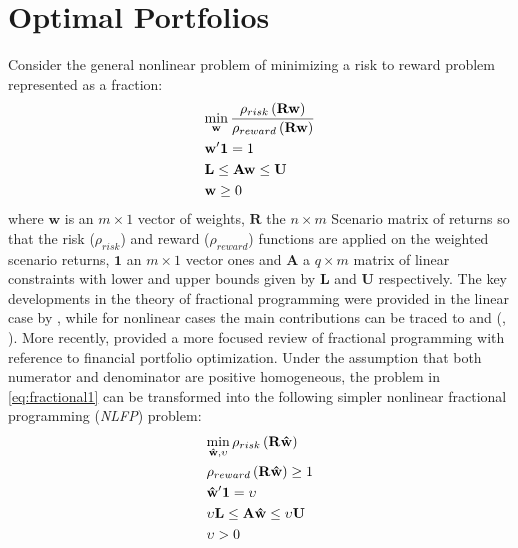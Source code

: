 \section{Optimal Portfolios}\label{sec:4}
Consider the general nonlinear problem of minimizing a risk to reward problem represented as a fraction:
\begin{equation}\label{eq:fractional1}
\begin{gathered}
  \mathop {\min }\limits_{\mathbf{w}} \frac{{{\rho _{risk}}\left( {{\mathbf{Rw}}} \right)}}{{{\rho _{reward}}\left( {{\mathbf{Rw}}} \right)}} \hfill \\
  {\mathbf{w}}'{\mathbf{1}}=1 \hfill \\
  {\mathbf{L}} \leq {\mathbf{Aw}} \leq {\mathbf{U}} \hfill \\
  {\mathbf{w}} \geq 0 \hfill \\
\end{gathered}
\end{equation}
where $\mathbf{w}$ is an $m\times 1$ vector of weights, $\mathbf{R}$ the
$n\times m$ Scenario matrix of returns so that the risk ($\rho_{risk}$) and
reward ($\rho_{reward}$) functions are applied on the weighted scenario
returns, $\mathbf{1}$ an $m\times 1$  vector ones and $\mathbf{A}$ a $q\times
m$ matrix of linear constraints with lower and upper bounds given by
$\mathbf{L}$ and $\mathbf{U}$ respectively. The key developments in the
theory of fractional programming were provided in the linear case by
\citet{Charnes1962}, while for nonlinear cases the main contributions
can be traced to \citet{Dinkelbach1967} and
\citeauthor{Schaible1976a}(\citeyear{Schaible1976a},
\citeyear{Schaible1976b}). More recently, \citet{Stoyanov2007} provided
a more focused review of fractional programming with reference to financial
portfolio optimization. Under the assumption that both numerator and
denominator are positive homogeneous, the problem in \eqref{eq:fractional1}
can be transformed into the following simpler nonlinear fractional
programming (\emph{NLFP}) problem:
\begin{equation}\label{eq:fractional2}
\begin{gathered}
  \mathop {\min }\limits_{{\mathbf{\hat w}},\upsilon } {\rho _{risk}}\left( {{\mathbf{R\hat w}}} \right) \hfill \\
  {\rho _{reward}}\left( {{\mathbf{R\hat w}}} \right) \geq 1 \hfill \\
  {\mathbf{\hat w}}'{\mathbf{1}}=\upsilon  \hfill \\
  \upsilon {\mathbf{L}} \leq {\mathbf{A\hat w}} \leq \upsilon {\mathbf{U}} \hfill \\
  \upsilon  > 0 \hfill \\
\end{gathered}
\end{equation}
